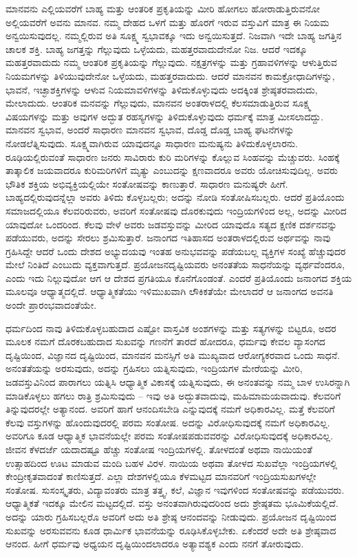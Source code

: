 ಮಾನವನು ಎಲ್ಲಿಯವರೆಗೆ ಬಾಹ್ಯ ಮತ್ತು ಆಂತರಿಕ ಪ್ರಕೃತಿಯನ್ನು ಮೀರಿ ಹೋಗಲು ಹೋರಾಡುತ್ತಿರುವನೋ ಅಲ್ಲಿಯವರೆಗೆ ಅವನು ಮಾನವ. ನಮ್ಮ ದೇಹದ ಒಳಗೆ ಮತ್ತು ಹೊರಗೆ ಇರುವ ವಸ್ತುವಿಗೆ ಮಾತ್ರ ಈ ನಿಯಮ ಅನ್ವಯಿಸುವುದಲ್ಲ. ನಮ್ಮಲ್ಲಿರುವ ಅತಿ ಸೂಕ್ಷ್ಮ ಸ್ವಭಾವಕ್ಕೂ ಇದು ಅನ್ವಯಿಸುತ್ತದೆ. ನಿಜವಾಗಿ ಇದೇ ಬಾಹ್ಯ ಜಗತ್ತಿನ ಚಾಲಕ ಶಕ್ತಿ. ಬಾಹ್ಯ ಜಗತ್ತನ್ನು ಗೆಲ್ಲುವುದು ಒಳ್ಳೆಯದು, ಮಹತ್ತರವಾದುದೇನೋ ನಿಜ. ಆದರೆ ಇದಕ್ಕೂ ಮಹತ್ತರವಾದುದು ನಮ್ಮ ಆಂತರಿಕ ಪ್ರಕೃತಿಯನ್ನು ಗೆಲ್ಲುವುದು. ನಕ್ಷತ್ರಗಳನ್ನು ಮತ್ತು ಗ್ರಹಾವಳಿಗಳನ್ನು ಆಳುತ್ತಿರುವ ನಿಯಮಗಳನ್ನು ತಿಳಿಯುವುದೇನೋ ಒಳ್ಳೆಯದು, ಮಹತ್ತರವಾದುದು. ಆದರೆ ಮಾನವನ ಕಾಮಕ್ರೋಧಾದಿಗಳನ್ನು, ಭಾವನೆ, ಇಚ್ಛಾಶಕ್ತಿಗಳನ್ನು ಆಳುವ ನಿಯಮಾವಳಿಗಳನ್ನು ತಿಳಿದುಕೊಳ್ಳುವುದು ಅದಕ್ಕಿಂತ ಶ್ರೇಷ್ಠತರವಾದುದು, ಮೇಲಾದುದು. ಆಂತರಿಕ ಮನವನ್ನು ಗೆಲ್ಲುವುದು, ಮಾನವನ ಅಂತರಾಳದಲ್ಲಿ ಕೆಲಸಮಾಡುತ್ತಿರುವ ಸೂಕ್ಷ್ಮ ವಿಷಯಗಳನ್ನು ಮತ್ತು ಅವುಗಳ ಅದ್ಭುತ ರಹಸ್ಯಗಳನ್ನು ತಿಳಿದುಕೊಳ್ಳುವುದು ಧರ್ಮಕ್ಕೆ ಮಾತ್ರ ಮೀಸಲಾದದ್ದು. ಮಾನವನ ಸ್ವಭಾವ, ಅಂದರೆ ಸಾಧಾರಣ ಮಾನವನ ಸ್ವಭಾವ, ದೊಡ್ಡ ದೊಡ್ಡ ಬಾಹ್ಯ ಘಟನೆಗಳನ್ನು ನೋಡಲೆತ್ನಿಸುವುದು. ಸೂಕ್ಷ್ಮವಾಗಿರುವ ಯಾವುದನ್ನೂ ಸಾಧಾರಣ ಮನುಷ್ಯನು ತಿಳಿದುಕೊಳ್ಳಲಾರನು. ರೂಢಿಯಲ್ಲಿರುವಂತೆ ಸಾಧಾರಣ ಜನರು ಸಾವಿರಾರು ಕುರಿ ಮರಿಗಳನ್ನು ಕೊಲ್ಲುವ ಸಿಂಹವನ್ನು ಮೆಚ್ಚುವರು. ಸಿಂಹಕ್ಕೆ ತಾತ್ಕಾಲಿಕ ಜಯವಾದರೂ ಕುರಿಮರಿಗಳಿಗೆ ಮೃತ್ಯು ಎಂಬುದನ್ನು ಕ್ಷಣವಾದರೂ ಅವರು ಯೋಚಿಸುವುದಿಲ್ಲ. ಅವರು ಭೌತಿಕ ಶಕ್ತಿಯ ಅಭಿವ್ಯಕ್ತಿಯಲ್ಲಿಯೇ ಸಂತೋಷವನ್ನು ಕಾಣುತ್ತಾರೆ. ಸಾಧಾರಣ ಮನುಷ್ಯರೇ ಹೀಗೆ. ಬಾಹ್ಯದಲ್ಲಿರುವುದನ್ನೆಲ್ಲಾ ಅವರು ತಿಳಿದು ಕೊಳ್ಳಬಲ್ಲರು; ಅದನ್ನು ನೋಡಿ ಸಂತೋಷಿಸಬಲ್ಲರು. ಆದರೆ ಪ್ರತಿಯೊಂದು ಸಮಾಜದಲ್ಲಿಯೂ ಕೆಲವರಿರುವರು, ಅವರಿಗೆ ಸಂತೋಷವು ದೊರಕುವುದು ಇಂದ್ರಿಯಗಳಿಂದ ಅಲ್ಲ, ಅದನ್ನು ಮೀರಿದ ಯಾವುದೋ ಒಂದರಿಂದ. ಕೆಲವು ವೇಳೆ ಅವರು ಜಡವಸ್ತುವನ್ನು ಮೀರಿದ ಯಾವುದೊ ಸತ್ಯದ ಕ್ಷಣಿಕ ದರ್ಶನವನ್ನು ಪಡೆಯುವರು, ಅದನ್ನು ಸೇರಲು ಶ್ರಮಿಸುತ್ತಾರೆ. ಜನಾಂಗದ ಇತಿಹಾಸದ ಅಂತರಾಳದಲ್ಲಿರುವ ಅರ್ಥವನ್ನು ನಾವು ಗ್ರಹಿಸಿದ್ದೇ ಆದರೆ ಒಂದು ದೇಶದ ಅಭ್ಯುದಯವು ಇಂತಹ ಅನುಭವವನ್ನು ಪಡೆಯಬಲ್ಲ ವ್ಯಕ್ತಿಗಳ ಸಂಖ್ಯೆ ಹೆಚ್ಚುವುದರ ಮೇಲೆ ನಿಂತಿದೆ ಎಂಬುದು ವ್ಯಕ್ತವಾಗುತ್ತದೆ. ಪ್ರಯೋಜನದೃಷ್ಟಿಯವರು ಅನಂತತೆಯ ಸಾಧನೆಯನ್ನು ವ್ಯರ್ಥವೆಂದರೂ, ಎಂದು ಇದು ನಿಲ್ಲುವುದೋ ಆಗ ಆ ದೇಶದ ಪ್ರಗತಿಯೂ ಕೊನೆಗೊಂಡಂತೆ. ಎಂದರೆ ಪ್ರತಿಯೊಂದು ಜನಾಂಗದ ಶಕ್ತಿಯ ಮೂಲವೂ ಆಧ್ಯಾತ್ಮದಲ್ಲಿದೆ. ಆಧ್ಯಾತ್ಮಿಕತೆಯು ಇಳಿಮುಖವಾಗಿ ಲೌಕಿಕತೆಯೇ ಮೇಲಾದರೆ ಆ ಜನಾಂಗದ ಅವನತಿ ಅಂದೇ ಪ್ರಾರಂಭವಾದಂತೆಯೇ.

ಧರ್ಮದಿಂದ ನಾವು ತಿಳಿದುಕೊಳ್ಳಬಹುದಾದ ಎಷ್ಟೋ ವಾಸ್ತವಿಕ ಅಂಶಗಳನ್ನು ಮತ್ತು ಸತ್ಯಗಳನ್ನು ಬಿಟ್ಟರೂ, ಅದರ ಮೂಲಕ ನಮಗೆ ದೊರಕಬಹುದಾದ ಸುಖವನ್ನು ಗಣನೆಗೆ ತಾರದೆ ಹೋದರೂ, ಧರ್ಮವು ಕೇವಲ ವ್ಯಾಸಂಗದ ದೃಷ್ಟಿಯಿಂದ, ವಿಜ್ಞಾನದ ದೃಷ್ಟಿಯಿಂದ, ಮಾನವನ ಮನಸ್ಸಿಗೆ ಅತಿ ಮುಖ್ಯವಾದ ಆರೋಗ್ಯಕರವಾದ ಒಂದು ಸಾಧನೆ. ಅನಂತತೆಯನ್ನು ಅರಸುವುದು, ಅದನ್ನು ಗ್ರಹಿಸಲು ಯತ್ನಿಸುವುದು, ಇಂದ್ರಿಯಗಳ ಮೇರೆಯನ್ನು ಮೀರಿ, ಜಡವಸ್ತುವಿನಿಂದ ಪಾರಾಗಲು ಯತ್ನಿಸಿ ಆಧ್ಯಾತ್ಮಿಕ ವಿಕಾಸಕ್ಕೆ ಯತ್ನಿಸುವುದು, ಈ ಅನಂತವನ್ನು ನಮ್ಮ ಬಾಳ ಉಸಿರನ್ನಾಗಿ ಮಾಡಿಕೊಳ್ಳಲು ಹಗಲು ರಾತ್ರಿ ಶ್ರಮಿಸುವುದು – ಇವು ಅತಿ ಅದ್ಭುತವಾದುವು, ಮಹಿಮಾಮಯವಾದುವು. ಕೆಲವರಿಗೆ ತಿನ್ನುವುದರಲ್ಲೇ ಅತ್ಯಾನಂದ. ಅವರಿಗೆ ಹಾಗೆ ಆನಂದಿಸಬೇಡಿ ಎನ್ನುವುದಕ್ಕೆ ನಮಗೆ ಅಧಿಕಾರವಿಲ್ಲ. ಮತ್ತೆ ಕೆಲವರಿಗೆ ಕೆಲವು ವಸ್ತುಗಳನ್ನು ಹೊಂದುವುದರಲ್ಲಿ ಪರಮ ಸಂತೋಷ. ಅದನ್ನು ವಿರೋಧಿಸುವುದಕ್ಕೆ ನಮಗೆ ಅಧಿಕಾರವಿಲ್ಲ. ಅವರಿಗೂ ಕೂಡ ಆಧ್ಯಾತ್ಮಿಕ ಭಾವನೆಯಲ್ಲೇ ಪರಮ ಸಂತೋಷಪಡುವವರನ್ನು ವಿರೋಧಿಸುವುದಕ್ಕೆ ಅಧಿಕಾರವಿಲ್ಲ. ಜೀವನ ಕೆಳದರ್ಜೆ ಯದಾದಷ್ಟೂ ಹೆಚ್ಚು ಸಂತೋಷ ಇಂದ್ರಿಯಗಳಲ್ಲಿ. ತೋಳದಂತೆ ಅಥವಾ ನಾಯಿಯಂತೆ ಉತ್ಸಾಹದಿಂದ ಊಟ ಮಾಡುವ ಮಂದಿ ಬಹಳ ವಿರಳ. ನಾಯಿಯ ಅಥವಾ ತೋಳದ ಸುಖವೆಲ್ಲಾ ಇಂದ್ರಿಯಗಳಲ್ಲಿ ಕೇಂದ್ರೀಕೃತವಾದಂತೆ ಕಾಣಿಸುತ್ತದೆ. ಎಲ್ಲಾ ದೇಶಗಳಲ್ಲಿಯೂ ಕೆಳಮಟ್ಟದ ಮಾನವರಿಗೆ ಇಂದ್ರಿಯಸುಖಗಳಲ್ಲೇ ಸಂತೋಷ. ಸುಸಂಸ್ಕೃತರು, ವಿದ್ಯಾವಂತರು ಮಾತ್ರ ತತ್ತ್ವ, ಕಲೆ, ವಿಜ್ಞಾನ ಇವುಗಳಿಂದ ಸಂತೋಷವನ್ನು ಪಡೆಯುವರು. ಆಧ್ಯಾತ್ಮಿಕತೆ ಇದಕ್ಕೂ ಮೇಲಿನ ಮಟ್ಟದಲ್ಲಿದೆ. ವಸ್ತು ಅನಂತವಾಗಿರುವುದರಿಂದ ಅದು ಶ್ರೇಷ್ಠತಮ ಭೂಮಿಕೆಯಲ್ಲಿದೆ. ಅದನ್ನು ಯಾರು ಗ್ರಹಿಸಬಲ್ಲರೊ ಅವರಿಗೆ ಅದು ಅತಿ ಶ್ರೇಷ್ಠ ಆನಂದವನ್ನು ನೀಡುವುದು. ಪ್ರಯೋಜನ ದೃಷ್ಟಿಯಿಂದ ಸುಖವನ್ನು ಅರಸುವವನು ಕೂಡ ಧಾರ್ಮಿಕ ಭಾವನೆಯನ್ನು ರೂಢಿಸಿಕೊಳ್ಳಬೇಕು. ಏಕೆಂದರೆ ಅದೇ ಅತಿ ಶ್ರೇಷ್ಠವಾದ ಆನಂದ. ಹೀಗೆ ಧರ್ಮವು ಅಧ್ಯಯನ ದೃಷ್ಟಿಯಿಂದಲಾದರೂ ಅತ್ಯಾವಶ್ಯಕ ಎಂದು ನನಗೆ ತೋರುವುದು.

